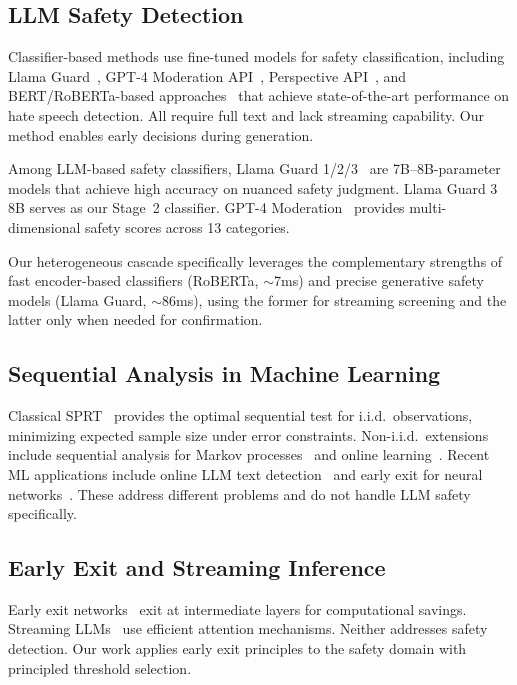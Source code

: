 \documentclass[acmtjournal, acmnowidth]{acmart}
\theoremstyle{definition}
\begin{document}
\subsection{LLM Safety Detection}

Classifier-based methods use fine-tuned models for safety classification, including Llama Guard~\cite{inan2023}, GPT-4 Moderation API~\cite{openai2023system}, Perspective API~\cite{gingeras2024}, and BERT/RoBERTa-based approaches~\cite{gehman2020, hartvigsen2022} that achieve state-of-the-art performance on hate speech detection. All require full text and lack streaming capability. Our method enables early decisions during generation.

Among LLM-based safety classifiers, Llama Guard 1/2/3~\cite{inan2023, grattafiori2024} are 7B--8B-parameter models that achieve high accuracy on nuanced safety judgment. Llama Guard 3 8B serves as our Stage~2 classifier. GPT-4 Moderation~\cite{openai2023system} provides multi-dimensional safety scores across 13 categories.

Our heterogeneous cascade specifically leverages the complementary strengths of fast encoder-based classifiers (RoBERTa, ${\sim}$7ms) and precise generative safety models (Llama Guard, ${\sim}$86ms), using the former for streaming screening and the latter only when needed for confirmation.

\subsection{Sequential Analysis in Machine Learning}

Classical SPRT~\cite{wald1945} provides the optimal sequential test for i.i.d.\ observations, minimizing expected sample size under error constraints. Non-i.i.d.\ extensions include sequential analysis for Markov processes~\cite{lai2001} and online learning~\cite{orabona2022}. Recent ML applications include online LLM text detection~\cite{chen2024} and early exit for neural networks~\cite{haseenarahmath2023}. These address different problems and do not handle LLM safety specifically.

\subsection{Early Exit and Streaming Inference}

Early exit networks~\cite{haseenarahmath2023, surace2023} exit at intermediate layers for computational savings. Streaming LLMs~\cite{wu2023} use efficient attention mechanisms. Neither addresses safety detection. Our work applies early exit principles to the safety domain with principled threshold selection.
\end{document}
